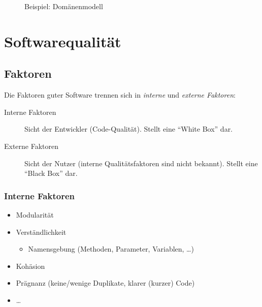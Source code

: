 				\begin{figure}[ht]
					\centering
					\caption{Beispiel: Domänenmodell}
					\label{fig:domain}
				\end{figure}

\chapter{Softwarequalität}
	\section{Faktoren}
		Die Faktoren guter Software trennen sich in \textit{interne} und \textit{externe Faktoren}:
		\begin{description}
			\item[Interne Faktoren] Sicht der Entwickler (Code-Qualität). Stellt eine \enquote{White Box} dar.
			\item[Externe Faktoren] Sicht der Nutzer (interne Qualitätsfaktoren sind nicht bekannt). Stellt eine \enquote{Black Box} dar.
		\end{description}

		\subsection{Interne Faktoren}
			\begin{itemize}
				\item Modularität
				\item Verständlichkeit
					\begin{itemize}
						\item Namensgebung (Methoden, Parameter, Variablen, \dots)
					\end{itemize}
				\item Kohäsion
				\item Prägnanz (keine/wenige Duplikate, klarer (kurzer) Code)
				\item \dots
			\end{itemize}

